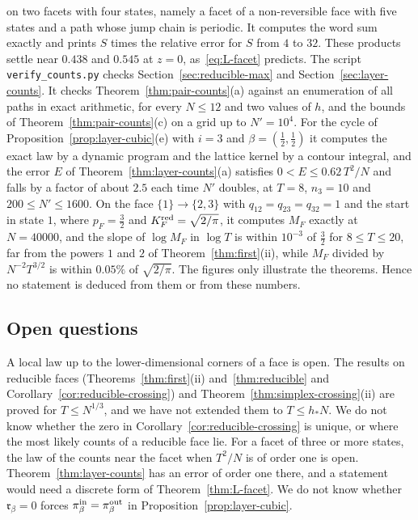 on two facets with four states, namely a facet of a non-reversible face with five
states and a path whose jump chain is periodic. It computes the word sum exactly
and prints $S$ times the relative error for $S$ from $4$ to $32$. These products
settle near $0.438$ and $0.545$ at $z=0$, as~\eqref{eq:L-facet} predicts. The script
\texttt{verify\_counts.py} checks Section~\ref{sec:reducible-max} and
Section~\ref{sec:layer-counts}. It checks Theorem~\ref{thm:pair-counts}(a) against an
enumeration of all paths in exact arithmetic, for every $N\le12$ and two values of $h$, and
the bounds of Theorem~\ref{thm:pair-counts}(c) on a grid up to $N'=10^4$. For the cycle of
Proposition~\ref{prop:layer-cubic}(e) with $i=3$ and $\beta=(\frac12,\frac12)$ it computes
the exact law by a dynamic program and the lattice kernel by a contour integral, and the error
$E$ of Theorem~\ref{thm:layer-counts}(a) satisfies $0<E\le0.62\,T^2/N$ and falls by a factor
of about $2.5$ each time $N'$ doubles, at $T=8$, $n_3=10$ and $200\le N'\le1600$. On the face $\{1\}\to\{2,3\}$ with
$q_{12}=q_{23}=q_{32}=1$ and the start in state $1$, where $p_F=\frac32$ and
$K^{\rm red}_F=\sqrt{2/\pi}$, it computes $M_F$ exactly at $N=40000$, and the slope of
$\log M_F$ in $\log T$ is within $10^{-3}$ of $\frac32$ for $8\le T\le20$, far from the powers $1$
and $2$ of Theorem~\ref{thm:first}(ii), while $M_F$ divided by $N^{-2}T^{3/2}$ is within
$0.05\%$ of $\sqrt{2/\pi}$. The
figures only illustrate the theorems. Hence no statement is deduced from them or from
these numbers.

\subsection*{Open questions}

A local law up to the lower-dimensional corners of a face is open. The results on reducible
faces (Theorems~\ref{thm:first}(ii) and~\ref{thm:reducible} and
Corollary~\ref{cor:reducible-crossing})\ifarxivbuild{} and Theorem~\ref{thm:simplex-crossing}(ii)\fi{}
are proved for $T\le N^{1/3}$, and we have not extended them to $T\le h_*N$. We do not know whether the
zero in Corollary~\ref{cor:reducible-crossing} is unique, or where the most likely counts of a
reducible face lie. For a facet of three or more states, the law of the counts near the facet
when $T^2/N$ is of order one is open. Theorem~\ref{thm:layer-counts} has an error of order one
there, and a statement would need a discrete form of Theorem~\ref{thm:L-facet}. We do not know
whether $\mathfrak r_\beta=0$ forces $\pi^{\rm in}_\beta=\pi^{\rm out}_\beta$ in
Proposition~\ref{prop:layer-cubic}.
